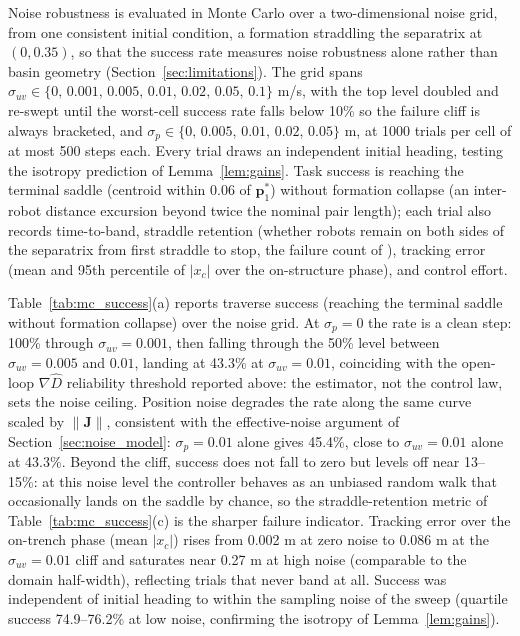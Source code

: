 \documentclass[lettersize,journal]{IEEEtran}
\begin{document}
Noise robustness is evaluated in Monte Carlo over a two-dimensional
noise grid, from one consistent initial condition, a formation
straddling the separatrix at $(0, 0.35)$, so that the success rate
measures noise robustness alone rather than basin geometry
(Section~\ref{sec:limitations}). The grid spans $\sigma_{uv} \in \{0,\,
0.001,\, 0.005,\, 0.01,\, 0.02,\, 0.05,\, 0.1\}$ m/s, with the top
level doubled and re-swept until the worst-cell success rate falls
below 10\% so the failure cliff is always bracketed, and $\sigma_p \in
\{0,\, 0.005,\, 0.01,\, 0.02,\, 0.05\}$ m, at 1000 trials per cell of
at most 500 steps each. Every trial draws an independent initial
heading, testing the isotropy prediction of Lemma~\ref{lem:gains}.
Task success is reaching the terminal saddle (centroid within 0.06 of
$\mathbf{p}^*_1$) without formation collapse (an inter-robot distance
excursion beyond twice the nominal pair length); each trial also
records time-to-band, straddle retention (whether robots remain on
both sides of the separatrix from first straddle to stop, the failure
count of \cite{9}), tracking error (mean and 95th percentile of
$|x_c|$ over the on-structure phase), and control effort.

Table~\ref{tab:mc_success}(a) reports traverse success (reaching the
terminal saddle without formation collapse) over the noise grid. At
$\sigma_p = 0$ the rate is a clean step: 100\% through
$\sigma_{uv} = 0.001$, then falling through the 50\% level between
$\sigma_{uv} = 0.005$ and $0.01$, landing at 43.3\% at
$\sigma_{uv} = 0.01$, coinciding with the open-loop $\nabla\hat{D}$
reliability threshold reported above: the estimator, not the control
law, sets the noise ceiling. Position noise degrades the rate along the same curve scaled
by $\|\mathbf{J}\|$, consistent with the effective-noise argument of
Section~\ref{sec:noise_model}: $\sigma_p = 0.01$ alone gives 45.4\%,
close to $\sigma_{uv} = 0.01$ alone at 43.3\%. Beyond the cliff, success
does not fall to zero but levels off near 13--15\%: at this noise level
the controller behaves as an unbiased random walk that occasionally
lands on the saddle by chance, so the straddle-retention metric of
Table~\ref{tab:mc_success}(c) is the sharper failure indicator. Tracking
error over the on-trench phase (mean $|x_c|$) rises from 0.002 m at zero
noise to 0.086 m at the $\sigma_{uv} = 0.01$ cliff and saturates near
0.27 m at high noise (comparable to the domain half-width), reflecting
trials that never band at all. Success was independent of initial
heading to within the sampling noise of the sweep (quartile success
74.9--76.2\% at low noise, confirming the isotropy of
Lemma~\ref{lem:gains}).
\end{document}
